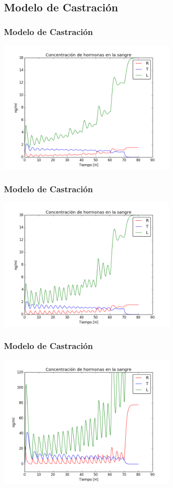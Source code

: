 \documentclass[10pt]{beamer}
\begin{document}
\subsection{Modelo de Castración}

\begin{frame}
\frametitle{Modelo de Castración}
\begin{center}
 \includegraphics[width=3.5in]{imagenes/Graficas/Castracion/castracion_hormonas_primer_modelo_m_8.png}
\end{center}
\end{frame}

\begin{frame}
\frametitle{Modelo de Castración}
\begin{center}
 \includegraphics[width=3.5in]{imagenes/Graficas/Castracion/castracion_hormonas_primer_modelo_m_12.png}
\end{center}
\end{frame}

\begin{frame}
\frametitle{Modelo de Castración}
\begin{center}
 \includegraphics[width=3.5in]{imagenes/Graficas/Castracion/castracion_hormonas_segundo_modelo.png}
\end{center}
\end{frame}
\end{document}
